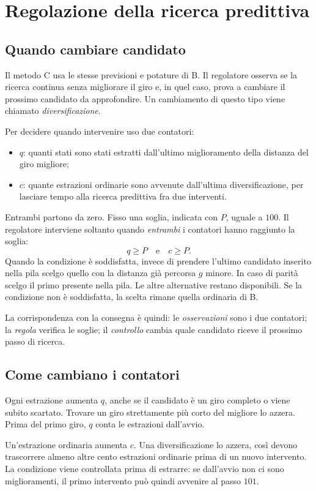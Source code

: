 \section{Regolazione della ricerca predittiva}
\label{sec:regulator}
\subsection{Quando cambiare candidato}
Il metodo C usa le stesse previsioni e potature di B. Il regolatore osserva
se la ricerca continua senza migliorare il giro e, in quel caso, prova a
cambiare il prossimo candidato da approfondire. Un cambiamento di questo
tipo viene chiamato \emph{diversificazione}.

Per decidere quando intervenire uso due contatori:
\begin{itemize}
\item $q$: quanti stati sono stati estratti dall'ultimo miglioramento
  della distanza del giro migliore;
\item $c$: quante estrazioni ordinarie sono avvenute dall'ultima
  diversificazione, per lasciare tempo alla ricerca predittiva fra due interventi.
\end{itemize}
Entrambi partono da zero. Fisso una soglia, indicata con $P$, uguale a
$100$. Il regolatore interviene soltanto quando \emph{entrambi} i contatori
hanno raggiunto la soglia:
\[
 q\geq P\quad\text{e}\quad c\geq P.
\]
Quando la condizione è soddisfatta, invece di prendere l'ultimo candidato
inserito nella pila scelgo quello con la distanza già percorsa $g$ minore.
In caso di parità scelgo il primo presente nella pila. Le altre alternative
restano disponibili. Se la condizione non è soddisfatta, la scelta rimane
quella ordinaria di B.

La corrispondenza con la consegna è quindi: le \emph{osservazioni} sono i
due contatori; la \emph{regola} verifica le soglie; il \emph{controllo}
cambia quale candidato riceve il prossimo passo di ricerca.

\subsection{Come cambiano i contatori}
Ogni estrazione aumenta $q$, anche se il candidato è un giro completo o
viene subito scartato. Trovare un giro strettamente più corto del migliore
lo azzera. Prima del primo giro, $q$ conta le estrazioni dall'avvio.

Un'estrazione ordinaria aumenta $c$. Una diversificazione lo azzera,
così devono trascorrere almeno altre cento estrazioni ordinarie prima di
un nuovo intervento. La condizione viene controllata prima di estrarre:
se dall'avvio non ci sono miglioramenti, il primo intervento può quindi
avvenire al passo $101$.

